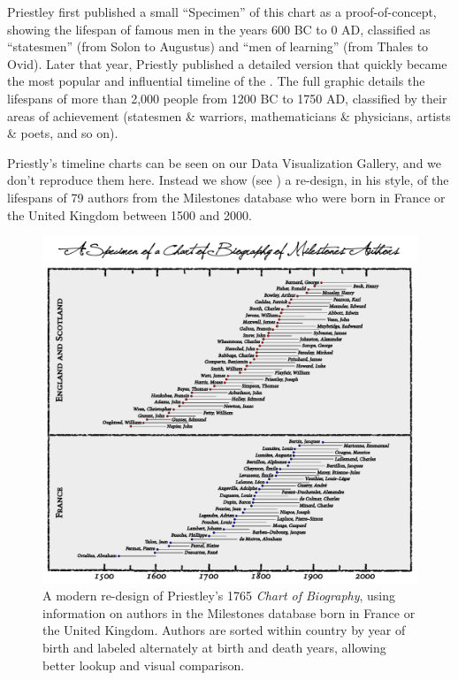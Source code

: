 Priestley first published a small ``Specimen'' of this chart as a proof-of-concept, showing the lifespan of famous men in the years 600 BC to 0 AD, classified as ``statesmen'' (from Solon to Augustus) and ``men of learning'' (from Thales to Ovid). Later that year, Priestly published a detailed version \citeyear{Priestley:1765} that quickly became the most popular and influential timeline of the .  The full graphic details the lifespans of more than 2,000 people from 1200 BC to 1750 AD, classified by their areas of achievement (statesmen \& warriors, mathematicians \& physicians, artists \& poets, and so on).

Priestly's timeline charts can be seen on our Data Visualization Gallery, and we don't reproduce them here.  Instead we show (see ) a re-design, in his style, of the lifespans of 79 authors from the Milestones database who were born in France or the United Kingdom between 1500 and 2000. 

\begin{figure}[!htb]
  \centering
  \includegraphics[width=.95\textwidth,clip]{fig/timespan}
  \caption{A modern re-design of Priestley's 1765 \emph{Chart of Biography}, using information on authors in the Milestones database born in France or the United Kingdom. Authors are sorted within country by year of birth and labeled alternately at birth and death years, allowing better lookup and visual comparison.}
  \label{fig:timespan}
\end{figure}

